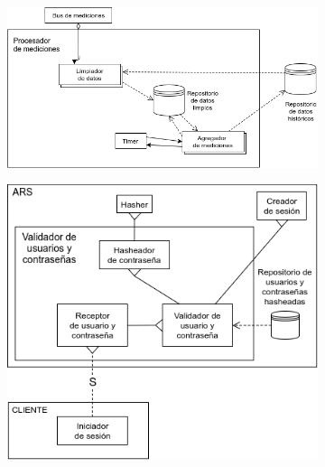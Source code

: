 \begin{figure}[h]
  \begin{subfigure}{\textwidth}
    \includegraphics[width=\textwidth]{imagenes/diagramas/procesadorDeMediciones.png}
  \end{subfigure}
  \label{}
  \caption{}
\end{figure}

\begin{figure}[h]
  \begin{subfigure}{\textwidth}
    \includegraphics[width=\textwidth]{imagenes/diagramas/validadorDeUsuarios.png}
  \end{subfigure}
  \label{}
  \caption{}
\end{figure}
